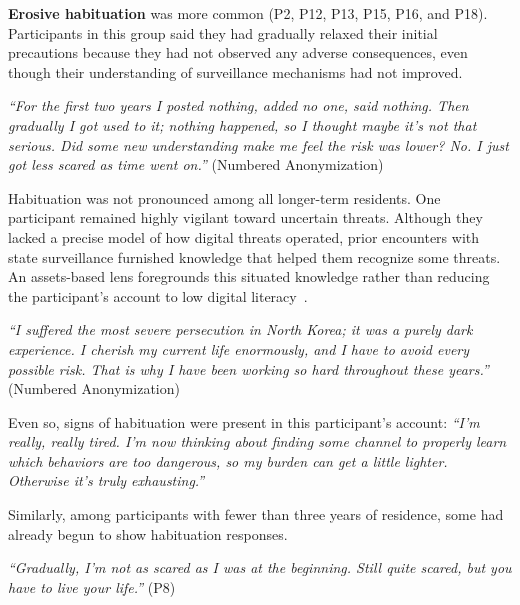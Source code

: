 \documentclass[conference,compsoc]{IEEEtran}
\begin{document}
\textbf{Erosive habituation} was more common (P2, P12, P13, P15, P16, and P18). Participants in this group said they had gradually relaxed their initial precautions because they had not observed any adverse consequences, even though their understanding of surveillance mechanisms had not improved.

\begin{displayquote}
\textit{``For the first two years I posted nothing, added no one, said nothing. Then gradually I got used to it; nothing happened, so I thought maybe it's not that serious. Did some new understanding make me feel the risk was lower? No. I just got less scared as time went on.''} (Numbered Anonymization)
\end{displayquote}

Habituation was not pronounced among all longer-term residents. One participant remained highly vigilant toward uncertain threats. Although they lacked a precise model of how digital threats operated, prior encounters with state surveillance furnished knowledge that helped them recognize some threats. An assets-based lens foregrounds this situated knowledge rather than reducing the participant's account to low digital literacy~\cite{wongvillacres2020culture,wongvillacres2022elevating}.

\begin{displayquote}
\textit{``I suffered the most severe persecution in North Korea; it was a purely dark experience. I cherish my current life enormously, and I have to avoid every possible risk. That is why I have been working so hard throughout these years.''} (Numbered Anonymization)
\end{displayquote}

Even so, signs of habituation were present in this participant's account: \textit{``I'm really, really tired. I'm now thinking about finding some channel to properly learn which behaviors are too dangerous, so my burden can get a little lighter. Otherwise it's truly exhausting.''}

Similarly, among participants with fewer than three years of residence, some had already begun to show habituation responses.

\begin{displayquote}
\textit{``Gradually, I'm not as scared as I was at the beginning. Still quite scared, but you have to live your life.''} (P8)
\end{displayquote}
\end{document}
